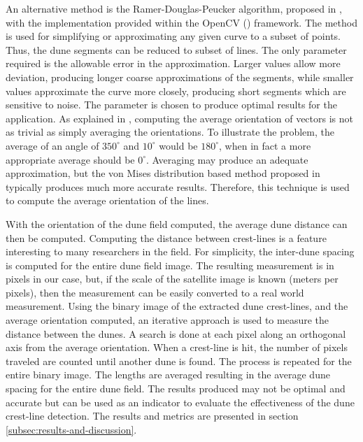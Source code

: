 An alternative method is the Ramer-Douglas-Peucker algorithm, proposed in \cite{ramer-1972-paper,douglas-peucker-1973-paper,douglas-hershberger-snoeyink-1992-paper}, with the implementation provided within the OpenCV (\cite{opencv_library}) framework. The method is used for simplifying or approximating any given curve to a subset of points. Thus, the dune segments can be reduced to subset of lines. The only parameter required is the allowable error in the approximation. Larger values allow more deviation, producing longer coarse approximations of the segments, while smaller values approximate the curve more closely, producing short segments which are sensitive to noise. The parameter is chosen to produce optimal results for the application. As explained in \cite{computing-average-orientation-of-vectors}, computing the average orientation of vectors is not as trivial as simply averaging the orientations. To illustrate the problem, the average of an angle of $350^{\circ}$ and $10^{\circ}$ would be $180^{\circ}$, when in fact a more appropriate average should be $0^{\circ}$. Averaging may produce an adequate approximation, but the von Mises distribution based method proposed in \cite{computing-average-orientation-of-vectors} typically produces much more accurate results. Therefore, this technique is used to compute the average orientation of the lines.

With the orientation of the dune field computed, the average dune distance can then be computed. Computing the distance between crest-lines is a feature interesting to many researchers in the field. For simplicity, the inter-dune spacing is computed for the entire dune field image. The resulting measurement is in pixels in our case, but, if the scale of the satellite image is known (meters per pixels), then the measurement can be easily converted to a real world measurement. Using the binary image of the extracted dune crest-lines, and the average orientation computed, an iterative approach is used to measure the distance between the dunes. A search is done at each pixel along an orthogonal axis from the average orientation. When a crest-line is hit, the number of pixels traveled are counted until another dune is found. The process is repeated for the entire binary image. The lengths are averaged resulting in the average dune spacing for the entire dune field. The results produced may not be optimal and accurate but can be used as an indicator to evaluate the effectiveness of the dune crest-line detection. The results and metrics are presented in section \ref{subsec:results-and-discussion}.
